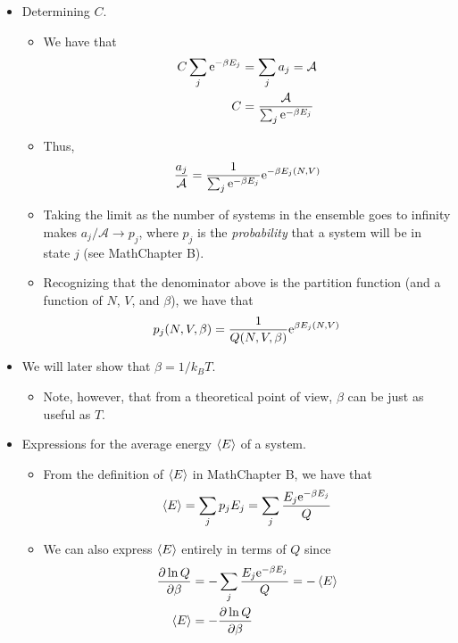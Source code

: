 \documentclass[../notes.tex]{subfiles}
\begin{document}
\begin{itemize}
    \item Determining $C$.
    \begin{itemize}
        \item We have that
        \begin{align*}
            C\sum_j\e[-\beta E_j] &= \sum_ja_j = \mathcal{A}\\
            C &= \frac{\mathcal{A}}{\sum_j\e[-\beta E_j]}
        \end{align*}
        \item Thus,
        \begin{equation*}
            \frac{a_j}{\mathcal{A}} = \frac{1}{\sum_j\e[-\beta E_j]}\e[-\beta E_j(N,V)]
        \end{equation*}
        \item Taking the limit as the number of systems in the ensemble goes to infinity makes $a_j/\mathcal{A}\to p_j$, where $p_j$ is the \emph{probability} that a system will be in state $j$ (see MathChapter B).
        \item Recognizing that the denominator above is the partition function (and a function of $N$, $V$, and $\beta$), we have that
        \begin{equation*}
            p_j(N,V,\beta) = \frac{1}{Q(N,V,\beta)}\e[\beta E_j(N,V)]
        \end{equation*}
    \end{itemize}
    \item We will later show that $\beta=1/k_BT$.
    \begin{itemize}
        \item Note, however, that from a theoretical point of view, $\beta$ can be just as useful as $T$.
    \end{itemize}
    \item Expressions for the average energy $\prb{E}$ of a system.
    \begin{itemize}
        \item From the definition of $\prb{E}$ in MathChapter B, we have that
        \begin{equation*}
            \prb{E} = \sum_j p_jE_j = \sum_j\frac{E_j\e[-\beta E_j]}{Q}
        \end{equation*}
        \item We can also express $\prb{E}$ entirely in terms of $Q$ since
        \begin{align*}
            \pdv{\ln Q}{\beta} &= -\sum_j\frac{E_j\e[-\beta E_j]}{Q} = -\prb{E}\\
            \prb{E} &= -\pdv{\ln Q}{\beta}

\end{align*}
\end{itemize}
\end{itemize}
\end{document}
